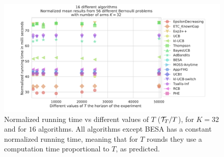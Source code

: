 \begin{figure}[h!]  %
	\includegraphics[width=1.10\linewidth]{16_different_algorithms__normtime_vs_horizons__56pb__K32_7Ts.pdf}
	\caption[Normalized running time vs different values of $T$.]{
        Normalized running time vs different values of $T$ ($\mathcal{T}_T / T$),
        for $K=32$ and for $16$ algorithms.
        All algorithms except BESA has a constant normalized running time, meaning that for $T$ rounds they use a computation time proportional to $T$, as predicted.
	}
	\label{fig:3:16_different_algorithms__normtime_vs_horizons__56pb__K32_7Ts}
\end{figure}


